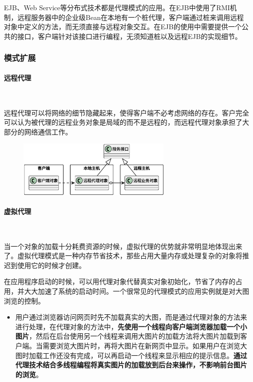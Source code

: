  EJB、Web Service等分布式技术都是代理模式的应用。在EJB中使用了RMI机制，远程服务器中的企业级Bean在本地有一个桩代理，客户端通过桩来调用远程对象中定义的方法，而无须直接与远程对象交互。在EJB的使用中需要提供一个公共的接口，客户端针对该接口进行编程，无须知道桩以及远程EJB的实现细节。


\subsubsection{模式扩展}
\paragraph*{远程代理}~{} \par
远程代理可以将网络的细节隐藏起来，使得客户端不必考虑网络的存在。客户完全可以认为被代理的远程业务对象是局域的而不是远程的，而远程代理对象承担了大部分的网络通信工作。
\begin{figure}[H]
    \vspace{-0.5em}
	\centering
	\includegraphics[width=0.68\textwidth]{images/代理模式拓展}
    \vspace{-1em}
\end{figure}

\paragraph*{虚拟代理}~{} \par
当一个对象的加载十分耗费资源的时候，虚拟代理的优势就非常明显地体现出来了。虚拟代理模式是一种内存节省技术，那些占用大量内存或处理复杂的对象将推迟到使用它的时候才创建。

在应用程序启动的时候，可以用代理对象代替真实对象初始化，节省了内存的占用，并大大加速了系统的启动时间。一个很常见的代理模式的应用实例就是对大图浏览的控制。
\begin{itemize}
    \item 用户通过浏览器访问网页时先不加载真实的大图，而是通过代理对象的方法来进行处理，在代理对象的方法中，\textbf{先使用一个线程向客户端浏览器加载一个小图片}，然后在后台使用另一个线程来调用大图片的加载方法将大图片加载到客户端。当需要浏览大图片时，再将大图片在新网页中显示。如果用户在浏览大图时加载工作还没有完成，可以再启动一个线程来显示相应的提示信息。\textbf{通过代理技术结合多线程编程将真实图片的加载放到后台来操作，不影响前台图片的浏览}。
\end{itemize}